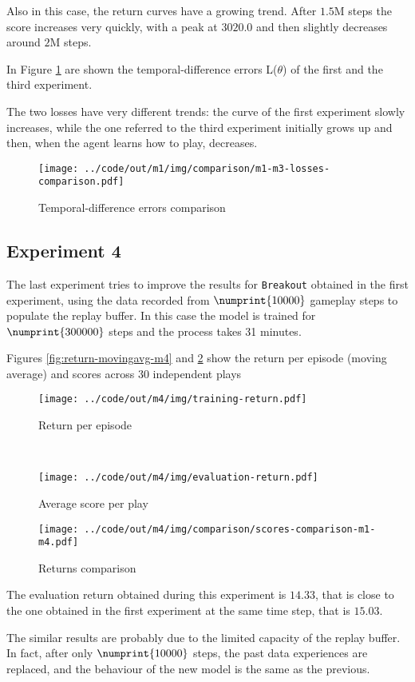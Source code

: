 \documentclass[a4paper,12pt]{article} %
\begin{document}
	Also in this case, the return curves have a growing trend. After $1.5 \mathrm{M}$ steps the score increases very quickly, with a peak at $3020.0$ and then slightly decreases around $2 \mathrm{M}$ steps.\bigskip
	
	In Figure \ref{fig:loss-m1-m3} are shown the temporal-difference errors L($\theta$) of the first and the third experiment.

	The two losses have very different trends: the curve of the first experiment slowly increases, while the one referred to the third experiment initially grows up and then, when the agent learns how to play, decreases.

	\begin{figure}[htb]
		\centering
		\texttt{[image: ../code/out/m1/img/comparison/m1-m3-losses-comparison.pdf]}	
		\caption{Temporal-difference errors comparison}
		\label{fig:loss-m1-m3}
	\end{figure}

	
	\subsection*{Experiment 4}
	The last experiment tries to improve the results for \texttt{Breakout} obtained in the first experiment, using the data recorded from $\numprint{10000}$ gameplay steps to populate the replay buffer.
	In this case the model is trained for $\numprint{300000}$ steps and the process takes 31 minutes.
	\bigskip

	Figures \ref{fig:return-movingavg-m4} and \ref{fig:score-m4} show the return per episode (moving average) and scores across 30 independent plays
	
	\begin{figure}[h]
		\begin{minipage}[b]{.49\textwidth}
			\centering
			\texttt{[image: ../code/out/m4/img/training-return.pdf]}	
			\caption{Return per episode}
			\label{fig:return-movingavg-m4}
		\end{minipage}
		~
		\begin{minipage}[b]{.49\textwidth}
			\centering
			\texttt{[image: ../code/out/m4/img/evaluation-return.pdf]}	
			\caption{Average score per play}
			\label{fig:score-m4}
		\end{minipage}
	\end{figure}

	\begin{figure}[htb]
		\centering
		\texttt{[image: ../code/out/m4/img/comparison/scores-comparison-m1-m4.pdf]}	
		\caption{Returns comparison}
		\label{fig:score-m1-m4}
	\end{figure}
	
	The evaluation return obtained during this experiment is $14.33$, that is close to the one obtained in the first experiment at the same time step, that is $15.03$.
	
	The similar results are probably due to the limited capacity of the replay buffer. In fact, after only $\numprint{10000}$ steps, the past data experiences are replaced, and the behaviour of the new model is the same as the previous.
	
	
\end{document}
